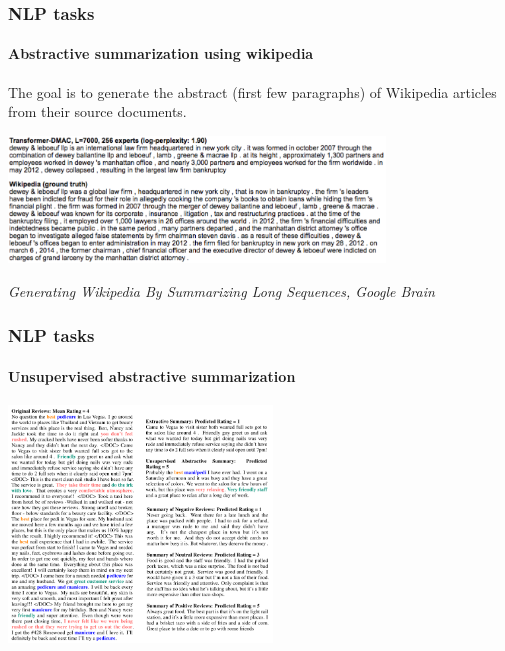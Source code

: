 \documentclass[9pt]{beamer}
\begin{document}
\begin{frame}
  \frametitle{NLP tasks}

  \framesubtitle{Abstractive summarization using wikipedia}

  The goal is to generate the abstract (first few paragraphs) of
  Wikipedia articles from their source documents.

  \begin{center}
    \includegraphics[width = 10cm]{images/wikipedia_summarization.png}
  \end{center}

  \bigskip

  {\footnotesize \textit{Generating Wikipedia By Summarizing Long
      Sequences, Google Brain}}
\end{frame}

\begin{frame}
  \frametitle{NLP tasks}

  \framesubtitle{Unsupervised abstractive summarization}

  \begin{center}
    \includegraphics[width = 7cm]{images/unsupervised_summarization.png}
  \end{center}
\end{frame}
\end{document}
